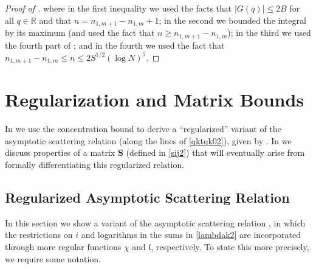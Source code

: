 \documentclass{amsart}
\numberwithin{equation}{section}
\theoremstyle{remark}
\theoremstyle{definition}
\begin{document}
\begin{proof}[Proof of ]
		\noindent where in the first inequality we used the facts that $| G(q) | \le 2B$ for all $q \in \mathbb{R}$ and that $n = n_{1,m+1} - n_{1,m} + 1$; in the second we bounded the integral by its maximum (and used the fact that $n \ge n_{1,m+1} - n_{1,m}$); in the third we used the fourth part of ; and in the fourth we used the fact that $n_{1,m+1} - n_{1,m} \le n \le 2S^{1/2} (\log N)^5$.
	\end{proof}
	
	




	
	
	\section{Regularization and Matrix Bounds}
	
	\label{InverseAsymptotic}
	
	In  we use the concentration bound  to derive a ``regularized'' variant of the asymptotic scattering relation  (along the lines of \eqref{qktqk02}), given by . In  we discuss properties of a matrix $\bm{S}$ (defined in \eqref{sij2}) that will eventually arise from formally differentiating this regularized relation.
	
	
	
	\subsection{Regularized Asymptotic Scattering Relation} 
	
	\label{YEstimate}
	
	In this section we show a variant of the asymptotic scattering relation , in which the restrictions on $i$ and logarithms in the sums in \eqref{lambdak2} are incorporated through more regular functions $\chi$ and $\mathfrak{l}$, respectively. To state this more precisely, we require some notation.
	
\end{document}
